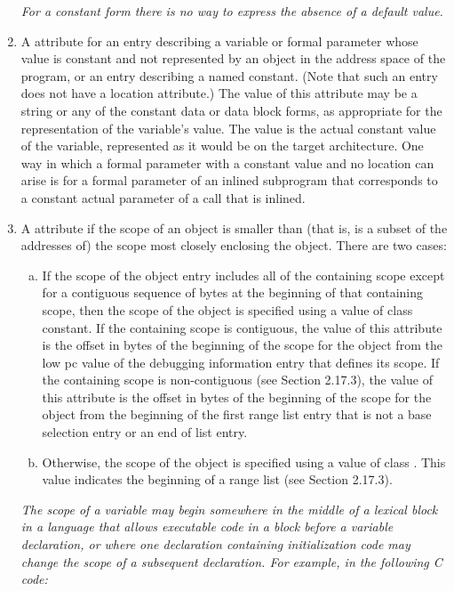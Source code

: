 \begin{enumerate}[1.]
\textit{For a constant form there is no way to 
express the absence of a default value.}

\item A  attribute for an entry describing a
variable or formal parameter whose value is constant and not
represented by an object in the address space of the program,
or an entry describing a named constant. (Note that such
an entry does not have a location attribute.) The value of
this attribute may be a string or any of the constant data
or data block forms, as appropriate for the representation
of the variable’s value. The value is the actual constant
value of the variable, represented as it would be on the
target architecture.  One way in which a formal parameter
with a constant value and no location can arise is for a
formal parameter of an inlined subprogram that corresponds
to a constant actual parameter of a call that is inlined.

\item A  attribute if the scope of an
object is smaller than (that is, is a subset of the addresses
of) the scope most closely enclosing the object. There are
two cases:
\begin{enumerate}[a)]
\item If the scope of the object entry includes all of the
containing scope except for a contiguous sequence of bytes at
the beginning of that containing scope, then the scope of the
object is specified using a value of class constant. If the
containing scope is contiguous, the value of this attribute
is the offset in bytes of the beginning of the scope for the
object from the low pc value of the debugging information
entry that defines its scope. If the containing scope
is non-contiguous (see Section 2.17.3), the value of this
attribute is the offset in bytes of the beginning of the scope
for the object from the beginning of the first range list entry
that is not a base selection entry or an end of list entry.

\item Otherwise, the scope of the object is specified using
a value of class . This value indicates the
beginning of a range list (see Section 2.17.3).
\end{enumerate}


\textit{The scope of a variable may begin somewhere in the middle of
a lexical block in a language that allows executable code in a
block before a variable declaration, or where one declaration
containing initialization code may change the scope of a
subsequent declaration.  For example, in the following C code:}


\end{enumerate}
